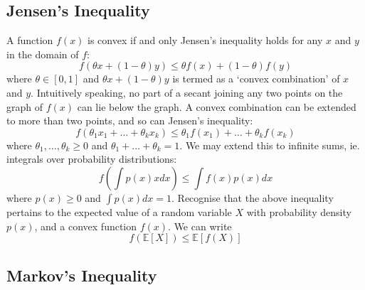 \documentclass[11pt]{report} %
\begin{document}
\subsection{Jensen's Inequality}

A function $f\left(x\right)$ is convex if and only Jensen's inequality holds for any $x$ and $y$ in the domain of $f$:
\begin{equation}
f\left(\theta x + \left(1 - \theta\right)y\right) \leq \theta f\left(x\right) + \left(1 - \theta\right)f\left(y\right)
\end{equation}
where $\theta \in \left[0, 1\right]$ and $\theta x + \left(1 - \theta\right)y$ is termed as a `convex combination' of $x$ and $y$. Intuitively speaking, no part of a secant joining any two points on the graph of $f\left(x\right)$ can lie below the graph. A convex combination can be extended to more than two points, and so can Jensen's inequality:
\begin{equation}
f\left(\theta_{1}x_{1} + \dots + \theta_{k}x_{k}\right) \leq \theta_{1}f\left(x_{1}\right) + \dots + \theta_{k}f\left(x_{k}\right)
\end{equation}
where $\theta_{1}, \dots, \theta_{k} \geq 0$ and $\theta_{1} + \dots + \theta_{k} = 1$. We may extend this to infinite sums, ie. integrals over probability distributions:
\begin{equation}
f\left(\int p\left(x\right) x dx\right) \leq \int f\left(x\right)p\left(x\right) dx
\end{equation}
where $p\left(x\right) \geq 0$ and $\int p\left(x\right) dx = 1$. Recognise that the above inequality pertains to the expected value of a random variable $X$ with probability density $p\left(x\right)$, and a convex function $f\left(x\right)$. We can write
\begin{equation}
f\left(\mathbb{E}\left[X\right]\right) \leq \mathbb{E}\left[f\left(X\right)\right]
\end{equation}

\subsection{Markov's Inequality}
\end{document}
